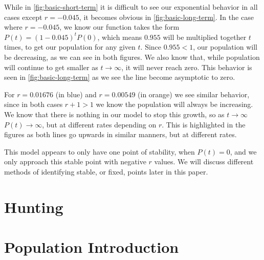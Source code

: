 \documentclass{article}
\begin{document}

While in \autoref{fig:basic-short-term} it is difficult to see our exponential behavior in all cases except $r = -0.045$, it becomes obvious in \autoref{fig:basic-long-term}. In the case where $r = -0.045$, we know our function takes the form $P(t) = (1-0.045)^tP(0)$, which means $0.955$ will be multiplied together $t$ times, to get our population for any given $t$. Since $0.955 < 1$, our population will be decreasing, as we can see in both figures. We also know that, while population will continue to get smaller as $t \rightarrow \infty$, it will never reach zero. This behavior is seen in \autoref{fig:basic-long-term} as we see the line become asymptotic to zero.

For $r = 0.01676$ (in blue) and $r = 0.00549$ (in orange) we see similar behavior, since in both cases $r + 1 > 1$ we know the population will always be increasing. We know that there is nothing in our model to stop this growth, so as $t \rightarrow \infty$ $P(t) \rightarrow \infty$, but at different rates depending on $r$. This is highlighted in the figures as both lines go upwards in similar manners, but at different rates.

This model appears to only have one point of stability, when $P(t) = 0$, and we only approach this stable point with negative $r$ values. We will discuss different methods of identifying stable, or fixed, points later in this paper.

\section{Hunting}

\section{Population Introduction}
\end{document}
